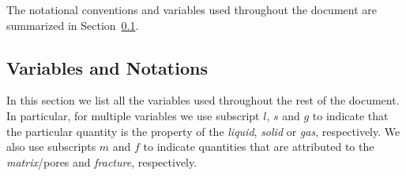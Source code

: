 The notational conventions and variables used throughout the document 
are summarized in Section~\ref{sec:notations}.




\subsection{Variables and Notations}
\label{sec:notations}


\def\bnabla{{\boldsymbol{\nabla}}}
\def\bg{{\boldsymbol{g}}}
\def\bq{{\boldsymbol{q}}}
\def\bx{{\boldsymbol{x}}}
\def\bJ{{\boldsymbol{J}}}
\def\K{{\mathbb K}}

\def\Frac{\displaystyle \frac}

\def\ucdot{{\,\cdot\,}}
\def\ukg{{\rm kg}}
\def\um{{\rm m}}
\def\us{{\rm s}}
\def\umol{{\rm mol}}
\def\upa{{\rm Pa}}


In this section we list all the variables used throughout the rest of the document.
In particular,
for multiple variables we use subscript 
$l$, $s$ and $g$
to indicate that the particular quantity is the property of the  
\emph{liquid}, \emph{solid} or \emph{gas}, respectively.
We also use subscripts $m$ and $f$
to indicate quantities that are attributed to the  
\emph{matrix}/pores and  \emph{fracture}, respectively.


